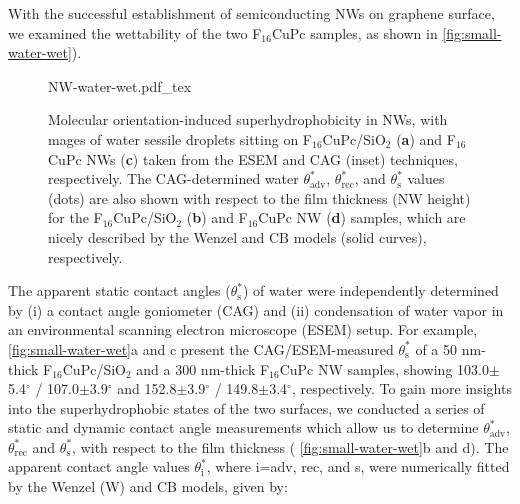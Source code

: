 With the successful establishment of semiconducting NWs on graphene
surface, we examined the wettability of the two F\(_{\text{16}}\)CuPc
samples, as shown in \autoref{fig:small-water-wet}).
%
\begin{figure}[htbp]
  \centering
  {NW-water-wet.pdf_tex}
  \caption{\label{fig:small-water-wet} Molecular
    orientation-induced superhydrophobicity in NWs, with mages of
    water sessile droplets sitting on
    F\(_{\text{16}}\)CuPc/SiO\(_{\text{2}}\) (\textbf{a}) and
    F\(_{\text{16}}\)CuPc NWs (\textbf{c}) taken from the ESEM and CAG
    (inset) techniques, respectively.
     The CAG-determined water
    \(\theta_{\mathrm{adv}}^{*}\), \(\theta_{\mathrm{rec}}^{*}\), and
    \(\theta_{\mathrm{s}}^{*}\) values (dots) are also shown with respect to the film
    thickness (NW height) for the
    F\(_{\text{16}}\)CuPc/SiO\(_{\text{2}}\) (\textbf{b}) and
    F\(_{\text{16}}\)CuPc NW (\textbf{d}) samples, which are nicely
    described by the Wenzel and CB models (solid curves),
    respectively.}
\end{figure}
%
The apparent
static contact angles (\(\theta_{\mathrm{s}}^{*}\)) of water were
independently determined by (i) a contact angle goniometer (CAG) and
(ii) condensation of water vapor in an environmental scanning electron
microscope (ESEM) setup. For example, \autoref{fig:small-water-wet}a and c
present the CAG/ESEM-measured \(\theta_{\mathrm{s}}^{*}\) of a 50
nm-thick F\(_{\text{16}}\)CuPc/SiO\(_{\text{2}}\) and a 300 nm-thick
F\(_{\text{16}}\)CuPc NW samples, showing 103.0\(\pm\)5.4\(^{\circ}\)
/ 107.0\(\pm\)3.9\(^{\circ}\) and 152.8\(\pm\)3.9\(^{\circ}\) /
149.8\(\pm\)3.4\(^{\circ}\), respectively. To gain more insights into
the superhydrophobic states of the two surfaces, we conducted a series
of static and dynamic contact angle measurements which allow us to
determine \(\theta_{\mathrm{adv}}^{*}\), \(\theta_{\mathrm{rec}}^{*}\)
and \(\theta_{\mathrm{s}}^{*}\), with respect to the film thickness (
\autoref{fig:small-water-wet}b and d). The apparent contact angle values
\(\theta_{\mathrm{i}}^{*}\), where i=adv, rec, and s, were numerically
fitted by the Wenzel (W) \cite{Wenzel_1936_wetting} and CB
\cite{Cassie_1944_wet} models, given by:

